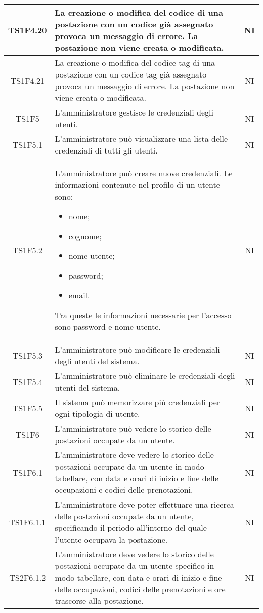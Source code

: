 \begin{center}
\begin{longtable}{|c|p{10cm}|c|}
			\hline	
			TS1F4.20 & La creazione o modifica del codice di una postazione con un codice già assegnato provoca un messaggio di errore. La postazione non viene creata o modificata. & NI \\	
			\hline	
			TS1F4.21 & La creazione o modifica del codice tag di una postazione con un codice tag già assegnato provoca un messaggio di errore. La postazione non viene creata o modificata. & NI \\	
			\hline	
			TS1F5 & L'amministratore gestisce le credenziali degli utenti. & NI \\	
			\hline
			TS1F5.1 & L'amministratore può visualizzare una lista delle credenziali di tutti gli utenti. & NI \\	
			\hline
			TS1F5.2 & L'amministratore può creare nuove credenziali. Le informazioni contenute nel profilo di un utente sono:
			\begin{itemize}
				\item nome;
				\item cognome;
				\item nome utente;
				\item password;
				\item email.
			\end{itemize}
			Tra queste le informazioni necessarie per l’accesso sono password e nome utente. & NI \\	
			\hline
			TS1F5.3 & L’amministratore può modificare le credenziali degli utenti del sistema. & NI \\	
			\hline
			TS1F5.4 & L’amministratore può eliminare le credenziali degli utenti del sistema. & NI \\	
			\hline
			TS1F5.5 & Il sistema può memorizzare più credenziali per ogni tipologia di utente. & NI \\	
			\hline
			TS1F6 & L'amministratore può vedere lo storico delle postazioni occupate da un utente. & NI \\	
			\hline
			TS1F6.1 & L'amministratore deve vedere lo storico delle postazioni occupate da un utente in modo tabellare, con data e orari di inizio e fine delle occupazioni e codici delle prenotazioni. & NI \\	
			\hline
			TS1F6.1.1 & L'amministratore deve poter effettuare una ricerca delle postazioni occupate da un utente, specificando il periodo all'interno del quale l'utente occupava la postazione. & NI \\	
			\hline
			TS2F6.1.2 & L'amministratore deve vedere lo storico delle postazioni occupate da un utente specifico in modo tabellare, con data e orari di inizio e fine delle occupazioni, codici delle prenotazioni e ore trascorse alla postazione. & NI \\	

\end{longtable}
\end{center}
